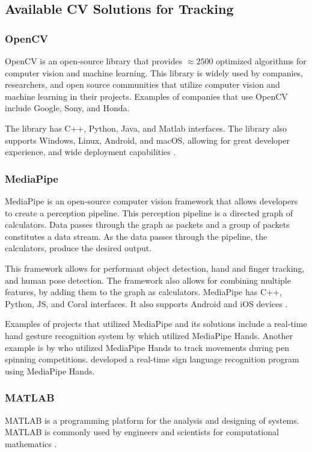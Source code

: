 \documentclass{report}
\begin{document}
\subsection{Available CV Solutions for Tracking}

\subsubsection{OpenCV}

OpenCV is an open-source library that provides ${\approx2500}$ optimized
algorithms for computer vision and machine learning. This library is widely used
by companies, researchers, and open source communities that utilize computer
vision and machine learning in their projects. Examples of companies that use
OpenCV include Google, Sony, and Honda.

The library has C++, Python, Java, and Matlab interfaces. The library also supports
Windows, Linux, Android, and macOS, allowing for great developer experience, and
wide deployment capabilities \parencite{opencv}.

\subsubsection{MediaPipe}
\label{section:rrl-mediapipe}

MediaPipe is an open-source computer vision framework that allows developers to
create a perception pipeline. This perception pipeline is a directed graph of
calculators. Data passes through the graph as packets and a group of packets
constitutes a data stream. As the data passes through the pipeline, the
calculators, produce the desired output.

This framework allows for performant object detection, hand and finger tracking,
and human pose detection. The framework also allows for combining multiple
features, by adding them to the graph as calculators. MediaPipe has C++, Python,
JS, and Coral interfaces. It also supports Android and iOS devices
\parencite{mediapipe}.

Examples of projects that utilized MediaPipe and its solutions include a
real-time hand gesture recognition system by \textcite{mediapipe-sample-1} which
utilized MediaPipe Hands. Another example is by \textcite{mediapipe-sample-2}
who utilized MediaPipe Hands to track movements during pen spinning
competitions. \textcite{mediapipe-sample-3} developed a real-time sign language
recognition program using MediaPipe Hands.


\subsubsection{MATLAB}
MATLAB is a programming platform for the analysis and designing of systems.
MATLAB is commonly used by engineers and scientists for computational
mathematics \parencite{what-matlab}.
\end{document}
